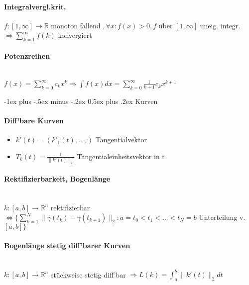 \documentclass[paper=a3,paper=landscape, fontsize=9pt,DIV=25]{scrartcl}
\makeatletter
\newcommand{\real}{{\mathbb{R}}}
\renewcommand{\section}{\@startsection{section}{1}{0mm}%
  {-1ex plus -.5ex minus -.2ex}%
  {0.5ex plus .2ex}%
  {\color{blue}\normalfont\large\bfseries}}
\makeatother
\begin{document}
\begin{multicols*}{4}
  \paragraph{Integralvergl.krit.}
  $f:[1,\infty]\rightarrow\real$ monoton fallend $, \forall x: f(x)>0, f$ über $[1,\infty]$ uneig. integr. $\Rightarrow \sum_{k=1}^{\infty}f(k)$ konvergiert


  \paragraph{Potenzreihen}\hspace{0pt} \\
  $f(x)=\sum_{k=0}^{\infty}c_kx^k \Rightarrow \int f(x)dx=\sum_{k=0}^{\infty}\frac{1}{k+1}c_kx^{k+1}$



  \section{Kurven}
  \paragraph{Diff'bare Kurven}
  \begin{itemize}
  \item $k'(t)=(k'_1(t),...,)$ Tangentialvektor
  \item $T_k(t)=\frac{1}{\lVert k'(t)\rVert_2}$ Tangentialeinheitsvektor in t
  \end{itemize}


  \paragraph{Rektifizierbarkeit, Bogenlänge}\hspace{0pt} \\
  $k:[a,b]\rightarrow \real^n$ rektifizierbar $\Leftrightarrow \{\sum_{k=1}^{N}\lVert\gamma(t_k)-\gamma(t_{k+1})\rVert_2: a = t_0 < t_1 < ... < t_N = b$ Unterteilung v. $[a,b]\}$


  \paragraph{Bogenlänge stetig diff'barer Kurven}\hspace{0pt} \\
  $k: [a,b]\rightarrow \real^n$ stückweise stetig diff'bar $\Rightarrow L(k)=\int_{a}^{b}\lVert k'(t)\rVert_2 dt$


\end{multicols*}
\end{document}
